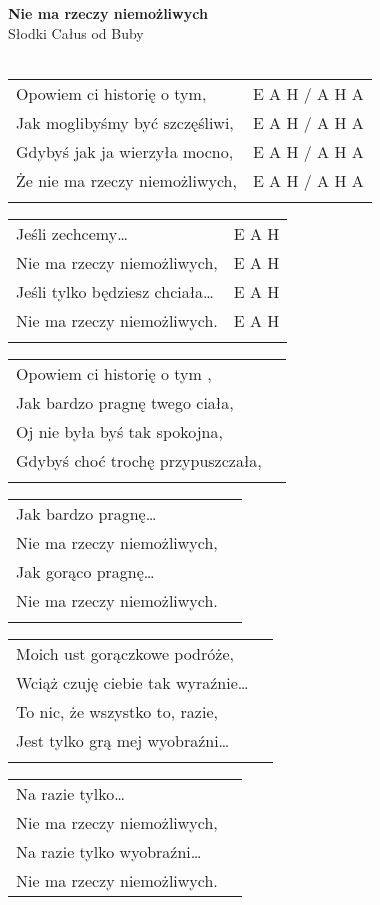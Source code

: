 \documentclass[a5paper]{article}
\begin{document}


\noindent
\fontsize{12pt}{15pt}\selectfont
\textbf{Nie ma rzeczy niemożliwych} \\
\fontsize{8pt}{10pt}\selectfont
Słodki Całus od Buby \\ \\
\fontsize{10pt}{12pt}\selectfont
{}
\begin{tabular}{@{}p{7.50cm}p{3cm}@{}}
\noindent
Opowiem ci historię o tym, & E A H / A H A \\
Jak moglibyśmy być szczęśliwi, & E A H / A H A \\
Gdybyś jak ja wierzyła mocno, & E A H / A H A \\
Że nie ma rzeczy niemożliwych, & E A H / A H A \\ \\
\end{tabular}

\noindent
\begin{tabular}{@{}p{6.50cm}p{3cm}@{}}
Jeśli zechcemy… & E A H \\
Nie ma rzeczy niemożliwych, & E A H \\
Jeśli tylko będziesz chciała… & E A H \\
Nie ma rzeczy niemożliwych. & E A H \\ \\
\end{tabular}

\noindent
\begin{tabular}{@{}p{7.50cm}p{3cm}@{}}
Opowiem ci historię o tym , \\
Jak bardzo pragnę twego ciała,\\
Oj nie była byś tak spokojna, \\
Gdybyś choć trochę przypuszczała, \\ \\
\end{tabular}

\noindent
\begin{tabular}{@{}p{7.50cm}p{3cm}@{}}
Jak bardzo pragnę… \\
Nie ma rzeczy niemożliwych, \\
Jak gorąco pragnę… \\
Nie ma rzeczy niemożliwych. \\ \\
\end{tabular}

\noindent
\begin{tabular}{@{}p{7.50cm}p{3cm}@{}}
Moich ust gorączkowe podróże, \\
Wciąż czuję ciebie tak wyraźnie… \\
To nic, że wszystko to, razie, \\
Jest tylko grą mej wyobraźni… \\ \\
\end{tabular}

\noindent
\begin{tabular}{@{}p{7.50cm}p{3cm}@{}}
Na razie tylko… \\ 
Nie ma rzeczy niemożliwych, \\
Na razie tylko wyobraźni… \\
Nie ma rzeczy niemożliwych. 
\end{tabular}
\end{document}
